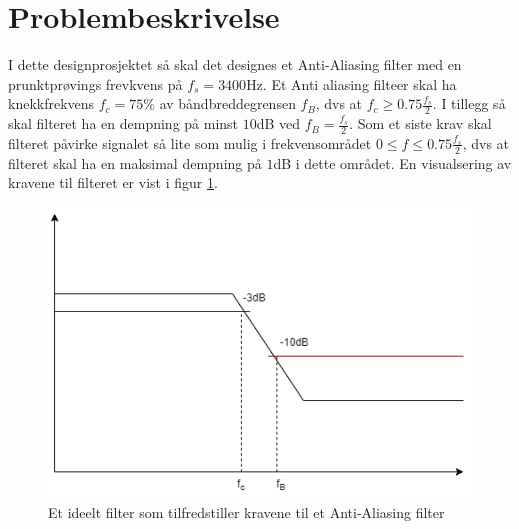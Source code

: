 \clearpage
\section{Problembeskrivelse}
\label{problemBeskrivelse}



I dette designprosjektet så skal det designes et Anti-Aliasing filter med en prunktprøvings frevkvens på $f_s = 3400$Hz. Et Anti aliasing filteer skal ha knekkfrekvens $f_c = 75\%$ av båndbreddegrensen $f_B$, dvs at $f_c \geq 0.75 \frac{f_s}{2}$. I tillegg så skal filteret ha en dempning på minst $10$dB ved $f_B = \frac{f_s}{2}$. Som et siste krav skal filteret påvirke signalet så lite som mulig i frekvensområdet $0 \leq f \leq 0.75 \frac{f_s}{2}$, dvs at filteret skal ha en maksimal dempning på $1$dB i dette området. En visualsering av kravene til filteret er vist i figur \ref{fig:krav}.

\begin{figure} [!h]
\centering
\includegraphics[width=0.7\linewidth]{Bilder/Anti_Aliasing_krav.drawio.png}
\caption{Et ideelt filter som tilfredstiller kravene til et Anti-Aliasing filter}
\label{fig:krav}
\end{figure}